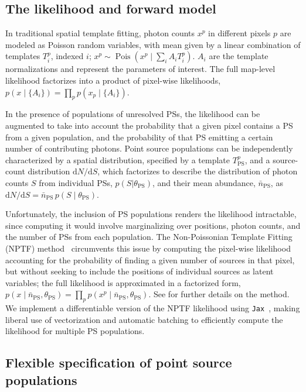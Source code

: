 \documentclass{article}
\theoremstyle{plain}
\theoremstyle{definition}
\theoremstyle{remark}
\begin{document}
\subsection{The likelihood and forward model}
    
In traditional spatial template fitting, photon counts $x^p$ in different pixels $p$ are modeled as Poisson random variables, with mean given by a linear combination of templates $T_i^p$, indexed $i$; $x^p \sim \operatorname{Pois}\left(x^p \mid \sum_i A_i T_i^p\right)$. $A_i$ are the template normalizations and represent the parameters of interest. The full map-level likelihood factorizes into a product of pixel-wise likelihoods, $p(x \mid \{A_i\})= \prod_p p(x_p \mid \{A_i\})$.

In the presence of populations of unresolved PSs, the likelihood can be augmented to take into account the probability that a given pixel contains a PS from a given population, and the probability of that PS emitting a certain number of contributing photons. Point source populations can be independently characterized by a spatial distribution, specified by a template $T_{\mathrm{PS}}^p$, and a source-count distribution ${\mathrm{d} N} / {\mathrm{d} S}$, which factorizes to describe the distribution of photon counts $S$ from individual PSs, $p(S | \theta_\mathrm{PS})$, and their mean abundance, $\bar n_\mathrm{PS}$, as ${\mathrm{d} N} / {\mathrm{d} S}=\bar n_\mathrm{PS} \, p(S \mid \theta_{\mathrm{PS}})$. 

Unfortunately, the inclusion of PS populations renders the likelihood intractable, since computing it would involve marginalizing over positions, photon counts, and the number of PSs from each population. The Non-Poissonian Template Fitting (NPTF) method~\cite{Lee:2014mza,Lee:2015fea} circumvents this issue by computing the pixel-wise likelihood accounting for the probability of finding a given number of sources in that pixel, but without seeking to include the positions of individual sources as latent variables; the full likelihood is approximated in a factorized form, $p\left(x \mid \bar n_\mathrm{PS}, \theta_{\mathrm{PS}}\right)=\prod_p p\left(x^p \mid \bar n_\mathrm{PS}, \theta_{\mathrm{PS}}\right)$. See \citet{Mishra-Sharma:2016gis} for further details on the method. We implement a differentiable version of the NPTF likelihood using \texttt{Jax}~\cite{jax2018github}, making liberal use of vectorization and automatic batching to efficiently compute the likelihood for multiple PS populations.

\subsection{Flexible specification of point source populations}
\end{document}
